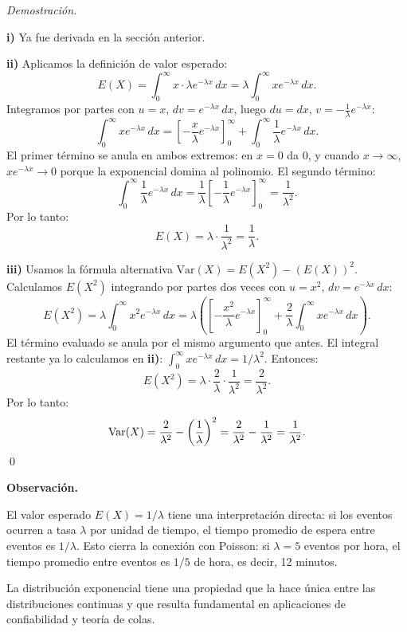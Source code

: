\documentclass[12pt, a4paper]{book}
\newenvironment{observacion}{%
    \par\medskip\noindent\textbf{\color{azul}Observaci\'{o}n.}\enspace\itshape
}{\par\medskip}
\renewenvironment{proof}{%
    \par\medskip\noindent\textit{Demostraci\'{o}n.}\enspace
}{\qed\par\medskip}
\numberwithin{equation}{chapter}
\begin{document}
\begin{proof}
	\textbf{i)} Ya fue derivada en la sección anterior.
	
	\medskip
	\textbf{ii)} Aplicamos la definición de valor esperado:
	\[
	E(X) = \int_0^{\infty} x \cdot \lambda e^{-\lambda x}\,dx
	= \lambda \int_0^{\infty} x e^{-\lambda x}\,dx.
	\]
	Integramos por partes con $u = x$, $dv = e^{-\lambda x}\,dx$,
	luego $du = dx$, $v = -\frac{1}{\lambda}e^{-\lambda x}$:
	\[
	\int_0^{\infty} x e^{-\lambda x}\,dx
	= \left[-\frac{x}{\lambda}e^{-\lambda x}\right]_0^{\infty}
	+ \int_0^{\infty} \frac{1}{\lambda}e^{-\lambda x}\,dx.
	\]
	El primer término se anula en ambos extremos: en $x = 0$ da
	$0$, y cuando $x \to \infty$, $xe^{-\lambda x} \to 0$ porque
	la exponencial domina al polinomio. El segundo término:
	\[
	\int_0^{\infty} \frac{1}{\lambda}e^{-\lambda x}\,dx
	= \frac{1}{\lambda}\left[-\frac{1}{\lambda}
	e^{-\lambda x}\right]_0^{\infty}
	= \frac{1}{\lambda^2}.
	\]
	Por lo tanto:
	\[
	E(X) = \lambda \cdot \frac{1}{\lambda^2} = \frac{1}{\lambda}.
	\]
	
	\medskip
	\textbf{iii)} Usamos la fórmula alternativa
	$\mathrm{Var}(X) = E(X^2) - (E(X))^2$. Calculamos $E(X^2)$
	integrando por partes dos veces con $u = x^2$,
	$dv = e^{-\lambda x}\,dx$:
	\[
	E(X^2) = \lambda\int_0^{\infty} x^2 e^{-\lambda x}\,dx
	= \lambda\left(
	\left[-\frac{x^2}{\lambda}e^{-\lambda x}
	\right]_0^{\infty}
	+ \frac{2}{\lambda}\int_0^{\infty}
	x e^{-\lambda x}\,dx\right).
	\]
	El término evaluado se anula por el mismo argumento que antes.
	El integral restante ya lo calculamos en \textbf{ii)}:
	$\int_0^{\infty} x e^{-\lambda x}\,dx = 1/\lambda^2$. Entonces:
	\[
	E(X^2) = \lambda \cdot \frac{2}{\lambda} \cdot
	\frac{1}{\lambda^2} = \frac{2}{\lambda^2}.
	\]
	Por lo tanto:
	\[
	\mathrm{Var}(X) = \frac{2}{\lambda^2} -
	\left(\frac{1}{\lambda}\right)^2
	= \frac{2}{\lambda^2} - \frac{1}{\lambda^2}
	= \frac{1}{\lambda^2}. \qedhere
	\]
\end{proof}

\begin{observacion}
	El valor esperado $E(X) = 1/\lambda$ tiene una interpretación
	directa: si los eventos ocurren a tasa $\lambda$ por unidad de
	tiempo, el tiempo promedio de espera entre eventos es
	$1/\lambda$. Esto cierra la conexión con Poisson: si
	$\lambda = 5$ eventos por hora, el tiempo promedio entre
	eventos es $1/5$ de hora, es decir, 12 minutos.
\end{observacion}

La distribución exponencial tiene una propiedad que la hace única
entre las distribuciones continuas y que resulta fundamental en
aplicaciones de confiabilidad y teoría de colas.
\end{document}
